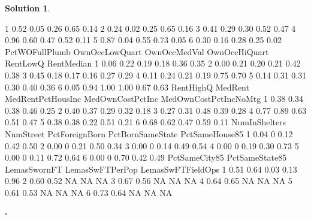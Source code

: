 \documentclass[twoside]{article}
\theoremstyle{definition}
\newtheorem*{solutionT}{Solution}
\newenvironment{solution}{\begin{cBox}\begin{solutionT}}{\hfill{\scriptsize\ensuremath{\square}}\end{solutionT}\end{cBox}}
\theoremstyle{definition}
\begin{document}
\begin{enumerate}
\begin{solution}
\begin{Schunk}
\begin{Soutput}
1          0.52             0.05           0.26           0.65           0.14
2          0.24             0.02           0.25           0.65           0.16
3          0.41             0.29           0.30           0.52           0.47
4          0.96             0.60           0.47           0.52           0.11
5          0.87             0.04           0.55           0.73           0.05
6          0.30             0.16           0.28           0.25           0.02
  PctWOFullPlumb OwnOccLowQuart OwnOccMedVal OwnOccHiQuart RentLowQ RentMedian
1           0.06           0.22         0.19          0.18     0.36       0.35
2           0.00           0.21         0.20          0.21     0.42       0.38
3           0.45           0.18         0.17          0.16     0.27       0.29
4           0.11           0.24         0.21          0.19     0.75       0.70
5           0.14           0.31         0.31          0.30     0.40       0.36
6           0.05           0.94         1.00          1.00     0.67       0.63
  RentHighQ MedRent MedRentPctHousInc MedOwnCostPctInc MedOwnCostPctIncNoMtg
1      0.38    0.34              0.38             0.46                  0.25
2      0.40    0.37              0.29             0.32                  0.18
3      0.27    0.31              0.48             0.39                  0.28
4      0.77    0.89              0.63             0.51                  0.47
5      0.38    0.38              0.22             0.51                  0.21
6      0.68    0.62              0.47             0.59                  0.11
  NumInShelters NumStreet PctForeignBorn PctBornSameState PctSameHouse85
1          0.04         0           0.12             0.42           0.50
2          0.00         0           0.21             0.50           0.34
3          0.00         0           0.14             0.49           0.54
4          0.00         0           0.19             0.30           0.73
5          0.00         0           0.11             0.72           0.64
6          0.00         0           0.70             0.42           0.49
  PctSameCity85 PctSameState85 LemasSwornFT LemasSwFTPerPop LemasSwFTFieldOps
1          0.51           0.64         0.03            0.13              0.96
2          0.60           0.52           NA              NA                NA
3          0.67           0.56           NA              NA                NA
4          0.64           0.65           NA              NA                NA
5          0.61           0.53           NA              NA                NA
6          0.73           0.64           NA              NA                NA

\end{Soutput}
\end{Schunk}
\end{solution}
\end{enumerate}
\end{document}
